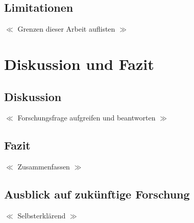 \documentclass{scrartcl}
\begin{document}
\subsection{Limitationen}

$\ll$ Grenzen dieser Arbeit auflisten $\gg$

\section{Diskussion und Fazit}

\subsection{Diskussion}

$\ll$ Forschungsfrage aufgreifen und beantworten $\gg$

\subsection{Fazit}

$\ll$ Zusammenfassen $\gg$

\subsection{Ausblick auf zukünftige Forschung}

$\ll$ Selbsterklärend $\gg$

\printbibliography

\listoffigures
\listoftables
\end{document}
